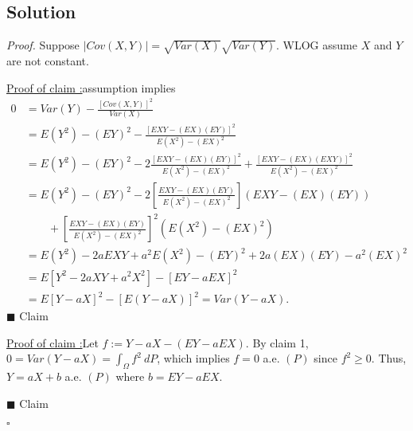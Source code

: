 \documentclass[12pt]{article}
\newcounter{ProofCounter}
\newcounter{ClaimCounter}[ProofCounter]
\newenvironment{Proof}{\stepcounter{ProofCounter}\textit{Proof.}}{\hfill$\square$}
\newenvironment{claim}[1]{\vspace{3mm}\stepcounter{ClaimCounter}\par\noindent\underline{\bf Claim \theClaimCounter:}\space#1}{}
\newenvironment{claimproof}[1]{\par\noindent\underline{Proof of claim \theClaimCounter:}\space#1}{\hfill $\blacksquare$ Claim \theClaimCounter}
\begin{document}
\subsection*{Solution}
\begin{Proof}
Suppose $|Cov(X,Y)| = \sqrt{Var(X)}\sqrt{Var(Y)}$. WLOG assume $X$ and $Y$ are not constant.

\begin{claimproof}
assumption implies
\begin{align*}
0 & = Var(Y) - \frac{[Cov(X,Y)]^{2}}{Var(X)} \\
& = E(Y^{2}) - (EY)^{2} - \frac{[EXY - (EX)(EY)]^{2}}{E(X^{2}) - (EX)^{2}} \\
& = E(Y^{2}) - (EY)^{2} - 2\frac{[EXY - (EX)(EY)]^{2}}{E(X^{2}) - (EX)^{2}} + \frac{[EXY - (EX)(EXY)]^{2}}{E(X^{2}) - (EX)^{2}} \\
& = E(Y^{2}) - (EY)^{2} - 2\left[ \frac{EXY - (EX)(EY)}{E(X^{2}) - (EX)^{2}} \right](EXY - (EX)(EY)) \\
& \qquad + \left[ \frac{EXY - (EX)(EY)}{E(X^{2}) -
(EX)^{2}} \right]^{2}(E(X^{2}) - (EX)^{2}) \\
& = E(Y^{2}) - 2aEXY + a^{2}E(X^{2}) - (EY)^{2} + 2a(EX)(EY) - a^{2}(EX)^{2} \\
& = E[Y^{2} - 2aXY + a^{2}X^{2}] - [EY - aEX]^{2} \\
& = E[Y - aX]^{2} - [E(Y - aX)]^{2} = Var(Y - aX).
\end{align*}
\end{claimproof}

\begin{claimproof}
Let $f := Y - aX - (EY - aEX)$. By claim 1, $0 = Var(Y - aX) = \int_{\Omega}f^{2}\ dP$,
which implies $f = 0$ a.e. $(P)$ since $f^{2} \geq 0$.  Thus, $Y = aX + b$ a.e. $(P)$ where $b = EY - aEX$. 

\end{claimproof}

\end{Proof}
\end{document}
